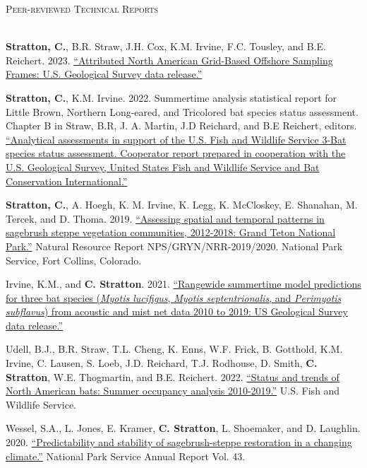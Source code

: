 \documentclass[a4paper]{article}
\newcommand{\lineunder} {
	\vspace*{-8pt} \\
	\hspace*{-18pt} \hrulefill \\
}
\newcommand{\header} [1] {
	{\hspace*{-18pt}\vspace*{6pt} \textsc{#1}}
	\vspace*{-6pt} \lineunder
}
\begin{document}
\header{Peer-reviewed Technical Reports}
\vspace*{2mm}

\textbf{Stratton, C.}, B.R. Straw, J.H. Cox, K.M. Irvine, F.C. Tousley,
and B.E. Reichert. 2023.
\href{https://doi.org/10.5066/P9H8NEOY}{``Attributed North American
Grid-Based Offshore Sampling Frames: U.S. Geological Survey data
release.''} \vspace*{2mm}

\textbf{Stratton, C.}, K.M. Irvine. 2022. Summertime analysis
statistical report for Little Brown, Northern Long-eared, and Tricolored
bat species status assessment. Chapter B in Straw, B.R, J. A. Martin,
J.D Reichard, and B.E Reichert, editors.
\href{https://doi.org/10.7944/P9B4RWEU}{``Analytical assessments in
support of the U.S. Fish and Wildlife Service 3-Bat species status
assessment. Cooperator report prepared in cooperation with the U.S.
Geological Survey, United States Fish and Wildlife Service and Bat
Conservation International.''} \vspace*{2mm}

\textbf{Stratton, C.}, A. Hoegh, K. M. Irvine, K. Legg, K. McCloskey, E.
Shanahan, M. Tercek, and D. Thoma. 2019.
\href{https://irma.nps.gov/DataStore/DownloadFile/631136}{``Assessing
spatial and temporal patterns in sagebrush steppe vegetation
communities, 2012-2018: Grand Teton National Park.''} Natural Resource
Report NPS/GRYN/NRR-2019/2020. National Park Service, Fort Collins,
Colorado. \vspace*{2mm}

Irvine, K.M., and \textbf{C. Stratton}. 2021.
\href{https://doi.org/10.5066/P9XZ8D6N.}{``Rangewide summertime model
predictions for three bat species (\textit{Myotis lucifigus},
\textit{Myotis septentrionalis}, and \textit{Perimyotis subflavus}) from
acoustic and mist net data 2010 to 2019: US Geological Survey data
release.''} \vspace*{2mm}

Udell, B.J., B.R. Straw, T.L. Cheng, K. Enns, W.F. Frick, B. Gotthold,
K.M. Irvine, C. Lausen, S. Loeb, J.D. Reichard, T.J. Rodhouse, D. Smith,
\textbf{C. Stratton}, W.E. Thogmartin, and B.E. Reichert. 2022.
\href{https://doi.org/10.5066/P92JGACB}{``Status and trends of North
American bats: Summer occupancy analysis 2010-2019.''} U.S. Fish and
Wildlife Service. \vspace*{2mm}

Wessel, S.A., L. Jones, E. Kramer, \textbf{C. Stratton}, L. Shoemaker,
and D. Laughlin. 2020.
\href{https://journals.uwyo.edu/index.php/uwnpsrc/article/view/6791/6301}{``Predictability
and stability of sagebrush-steppe restoration in a changing climate.''}
National Park Service Annual Report Vol. 43. \vspace*{2mm}
\end{document}
